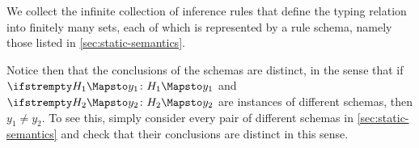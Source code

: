 \begin{remark}
    \label{rem:typing-rule-schema-uniqueness}
    We collect the infinite collection of inference rules that define the typing relation into finitely many sets, each of which is represented by a rule schema, namely those listed in \cref{sec:static-semantics}.
    
    Notice then that the conclusions of the schemas are distinct, in the sense that if $\myinfrule{}{H_1}{y_1}$ and $\myinfrule{}{H_2}{y_2}$ are instances of different schemas, then $y_1 \neq y_2$. To see this, simply consider every pair of different schemas in \cref{sec:static-semantics} and check that their conclusions are distinct in this sense.
\end{remark}


